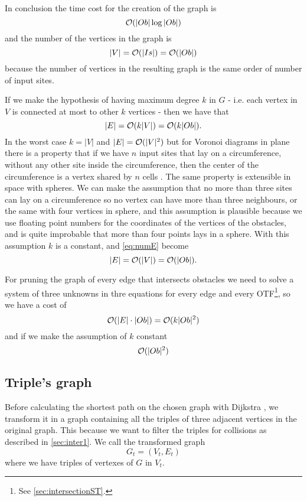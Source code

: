 \documentclass[dissertation.tex]{subfiles}
\begin{document}
In conclusion the time cost for the creation of the graph
is
\newcommand{\eqCostGraph}{\ensuremath{\bigO(|Ob|\log |Ob|)}}
\begin{equation}
  \label{eq:costGraph}
  \eqCostGraph
\end{equation}
and the number of the vertices in the graph
is 
\begin{equation}
  \label{eq:numV}
  |V|=\mathcal{O}(|Is|)=\mathcal{O}(|Ob|)
\end{equation}
because the number of vertices in the resulting graph is the
same order of number of input sites.

If we make the hypothesis of having maximum degree $k$ in $G$ -
i.e. each vertex in $V$ is connected at most to other $k$ vertices -
then we have that
\begin{equation}
  \label{eq:numE}
  |E|=\mathcal{O}(k|V|)=\mathcal{O}(k|Ob|).
\end{equation}
In the worst case $k=|V|$ and $|E|=\mathcal{O}(|V|^2)$ but for Voronoi
diagrams in plane there is a property that if we have $n$ input sites
that lay on a circumference, without any other site inside the
circumference, then the center of the circumference is a vertex shared
by $n$ cells \cite{deberg}. The same property is extensible in space with
spheres. We can make the assumption that no more than three sites can lay
on a circumference so no vertex can have more than three neighbours,
or the same with four vertices in sphere, and this assumption is
plausible because we use floating point numbers for the coordinates of
the vertices of the obstacles, and is quite improbable that more than
four points lays in a sphere. With this assumption $k$ is a constant,
and \cref{eq:numE} become
\begin{equation*}
  |E|=\mathcal{O}(|V|)=\mathcal{O}(|Ob|).
\end{equation*}

For pruning the graph of every edge that intersects obstacles we need
to solve a system of three unknowns in thre equations for every edge
and every \ac{OTF}\footnote{See \cref{sec:intersectionST}.}, so
we have a cost of
\newcommand{\eqCostPruning}{\ensuremath{\bigO(k|Ob|^2)}}
\begin{equation}
  \label{eq:costPruning}
  \bigO(|E|\cdot|Ob|)=\eqCostPruning
\end{equation}
and if we make the assumption of $k$ constant
\begin{equation*}
  \mathcal{O}(|Ob|^2)
\end{equation*}

\subsection{Triple's graph}\label{sec:trigraph}
Before calculating the shortest path on the chosen graph with Dijkstra
\cite{dijkstra}\cite{knuth}, we
transform it in a graph containing all the triples
of three adjacent vertices in the original graph. This because we want
to filter the triples for collisions as described in
\cref{sec:inter1}. We call the transformed graph
$$G_t=(V_t,E_t)$$
where we have triples of vertexes of $G$ in $V_t$.
\end{document}
